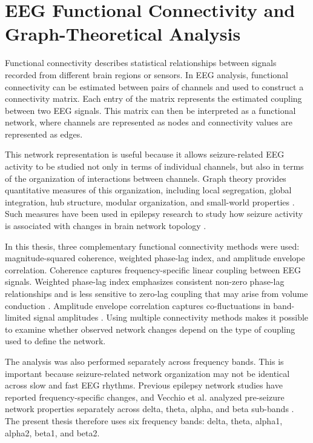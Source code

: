 \section{EEG Functional Connectivity and Graph-Theoretical Analysis}
\label{sec:introduction-connectivity-graph-analysis}

Functional connectivity describes statistical relationships between signals
recorded from different brain regions or sensors. In EEG analysis, functional
connectivity can be estimated between pairs of channels and used to construct a
connectivity matrix. Each entry of the matrix represents the estimated coupling
between two EEG signals. This matrix can then be interpreted as a functional
network, where channels are represented as nodes and connectivity values are
represented as edges.

This network representation is useful because it allows seizure-related EEG
activity to be studied not only in terms of individual channels, but also in
terms of the organization of interactions between channels. Graph theory
provides quantitative measures of this organization, including local
segregation, global integration, hub structure, modular organization, and
small-world properties \cite{Rubinov2010}. Such measures have been used in
epilepsy research to study how seizure activity is associated with changes in
brain network topology \cite{Ponten2007,Vecchio2016,Lanzone2022}.

In this thesis, three complementary functional connectivity methods were used:
magnitude-squared coherence, weighted phase-lag index, and amplitude envelope
correlation. Coherence captures frequency-specific linear coupling between EEG
signals. Weighted phase-lag index emphasizes consistent non-zero phase-lag
relationships and is less sensitive to zero-lag coupling that may arise from
volume conduction \cite{Vinck2011}. Amplitude envelope correlation captures
co-fluctuations in band-limited signal amplitudes \cite{Bruns2000,Hipp2012}.
Using multiple connectivity methods makes it possible to examine whether
observed network changes depend on the type of coupling used to define the
network.

The analysis was also performed separately across frequency bands. This is
important because seizure-related network organization may not be identical
across slow and fast EEG rhythms. Previous epilepsy network studies have
reported frequency-specific changes, and Vecchio et al. analyzed pre-seizure
network properties separately across delta, theta, alpha, and beta sub-bands
\cite{Ponten2007,Vecchio2016}. The present thesis therefore uses six frequency
bands: delta, theta, alpha1, alpha2, beta1, and beta2.

